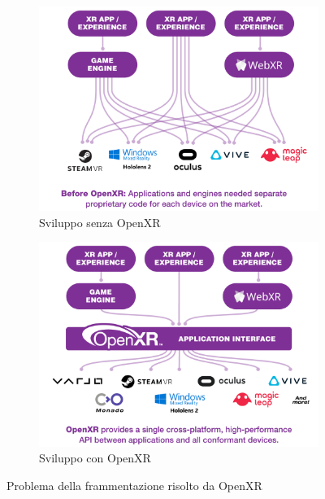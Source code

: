 \begin{figure}[t]
    \centering
    \begin{subfigure}{0.6\textwidth}
        \centering
        \includegraphics[width=\textwidth]{images/OpenXR-Before_3.png}
        \caption{Sviluppo senza OpenXR}
        \label{fig:figure111a}
    \end{subfigure}
    \begin{subfigure}{0.6\textwidth}
        \centering
        \includegraphics[width=\textwidth]{images/OpenXR-After_3.png}
        \caption{Sviluppo con OpenXR}
        \label{fig:figure111b}
    \end{subfigure}
       \caption{Problema della frammentazione risolto da OpenXR}
       \label{fig:figure111}
\end{figure}


